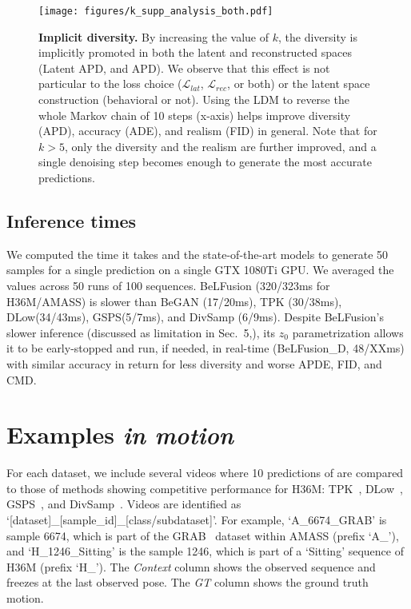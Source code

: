 \documentclass[10pt,twocolumn,letterpaper]{article}
\begin{document}
\begin{figure*}
    \centering
    \texttt{[image: figures/k\_supp\_analysis\_both.pdf]}
    \caption{\textbf{Implicit diversity. }By increasing the value of $k$, the diversity is implicitly promoted in both the latent and reconstructed spaces (Latent APD, and APD). 
    We observe that this effect is not particular to the loss choice ($\mathcal{L}_{lat}$, $\mathcal{L}_{rec}$, or both) or the latent space construction (behavioral or not). Using the LDM to reverse the whole Markov chain of 10 steps (x-axis) helps improve diversity (APD), accuracy (ADE), and realism (FID) in general. Note that for $k>5$, only the diversity and the realism are further improved, and a single denoising step becomes enough to generate the most accurate predictions.}
    \label{fig:supp_ext_k_analysis}
\end{figure*}



\subsection{Inference times}
\label{subsec:supp_implementation_times}

We computed the time it takes \modelname{} and the state-of-the-art models to generate 50 samples for a single prediction on a single GTX 1080Ti GPU. We averaged the values across 50 runs of 100 sequences.
BeLFusion (320/323ms for H36M/AMASS) is slower than BeGAN (17/20ms), TPK (30/38ms), DLow(34/43ms), GSPS(5/7ms), and DivSamp (6/9ms).
Despite BeLFusion's slower inference (discussed as limitation in Sec.~5,), its $z_0$ parametrization allows it to be early-stopped and run, if needed, in real-time (BeLFusion\_D, 48/XXms) with similar accuracy in return for less diversity and worse APDE, FID, and CMD.

 \section{Examples \textit{in motion}}
\label{sec:supp_visual_examples}

For each dataset, we include several videos where 10 predictions of \modelname{} are compared to those of methods showing competitive performance for H36M: TPK~\cite{walker2017theposeknows}, DLow~\cite{yuan2020dlow}, GSPS~\cite{mao2021gsps}, and DivSamp~\cite{dang2022diverse}. Videos are identified as `[dataset]\_[sample\_id]\_[class/subdataset]'. For example, `A\_6674\_GRAB' is sample 6674, which is part of the GRAB~\cite{taheri2020grab} dataset within AMASS (prefix `A\_'), and `H\_1246\_Sitting' is the sample 1246, which is part of a `Sitting' sequence of H36M (prefix `H\_'). The \textit{Context} column shows the observed sequence and freezes at the last observed pose. The \textit{GT} column shows the ground truth motion. 
\end{document}
